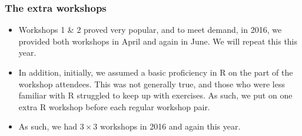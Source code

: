 \begin{frame}
	\frametitle{The extra workshops}

	\begin{itemize}
		\item Workshops 1 \& 2 proved very popular, and to meet demand, in 2016, we provided both workshops in April and again in June. We will repeat this this year.
		\item In addition, initially, we assumed a basic proficiency in R on the part of the workshop attendees. This was not generally true, and those who were less familiar with R struggled to keep up with exercises. As such, we put on one extra R workshop before each regular workshop pair.
		\item As such, we had $3 \times 3$ workshops in 2016 and again this year.
	\end{itemize}

\end{frame}
